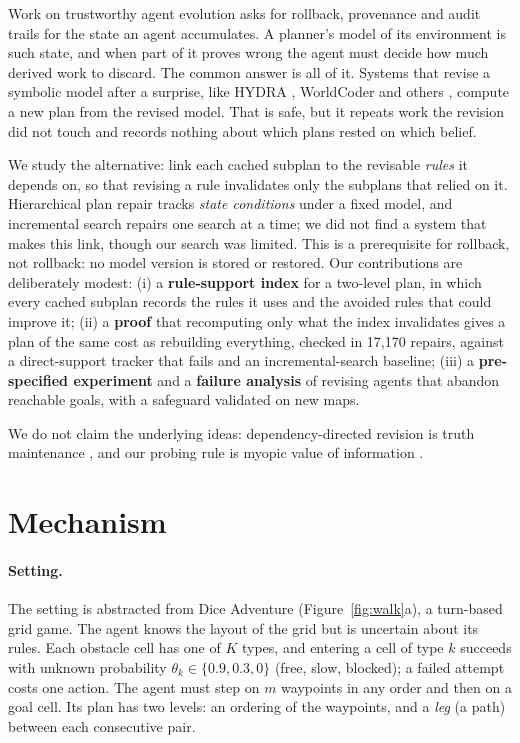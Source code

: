 \documentclass[letterpaper]{article}
\begin{document}
Work on trustworthy agent evolution asks for rollback, provenance and audit trails for the state an agent accumulates. A planner's model of its environment is such state, and when part of it proves wrong the agent must decide how much derived work to discard. The common answer is all of it. Systems that revise a symbolic model after a surprise, like HYDRA \citep{mohan2024}, WorldCoder \citep{tang2024} and others \citep{tsividis2021,karia2024}, compute a new plan from the revised model. That is safe, but it repeats work the revision did not touch and records nothing about which plans rested on which belief.

We study the alternative: link each cached subplan to the revisable \emph{rules} it depends on, so that revising a rule invalidates only the subplans that relied on it. Hierarchical plan repair tracks \emph{state conditions} under a fixed model, and incremental search repairs one search at a time; we did not find a system that makes this link, though our search was limited. This is a prerequisite for rollback, not rollback: no model version is stored or restored. Our contributions are deliberately modest: (i) a \textbf{rule-support index} for a two-level plan, in which every cached subplan records the rules it uses and the avoided rules that could improve it; (ii) a \textbf{proof} that recomputing only what the index invalidates gives a plan of the same cost as rebuilding everything, checked in 17,170 repairs, against a direct-support tracker that fails and an incremental-search baseline; (iii) a \textbf{pre-specified experiment} and a \textbf{failure analysis} of revising agents that abandon reachable goals, with a safeguard validated on new maps.

We do not claim the underlying ideas: dependency-directed revision is truth maintenance \citep{doyle1979}, and our probing rule is myopic value of information \citep{dearden1999}.

\section{Mechanism}

\paragraph{Setting.} The setting is abstracted from Dice Adventure (Figure~\ref{fig:walk}a), a turn-based grid game. The agent knows the layout of the grid but is uncertain about its rules. Each obstacle cell has one of $K$ types, and entering a cell of type $k$ succeeds with unknown probability $\theta_k \in \{0.9, 0.3, 0\}$ (free, slow, blocked); a failed attempt costs one action. The agent must step on $m$ waypoints in any order and then on a goal cell. Its plan has two levels: an ordering of the waypoints, and a \emph{leg} (a path) between each consecutive pair.
\end{document}
